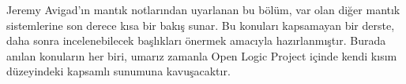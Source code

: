\documentclass[../../../include/open-logic-chapter]{subfiles}
\begin{document}

\begin{editorial}
  Jeremy Avigad'ın mantık notlarından uyarlanan bu bölüm, var olan diğer
  mantık sistemlerine son derece kısa bir bakış sunar. Bu konuları kapsamayan
  bir derste, daha sonra incelenebilecek başlıkları önermek amacıyla
  hazırlanmıştır. Burada anılan konuların her biri, umarız zamanla Open Logic
  Project içinde kendi kısım düzeyindeki kapsamlı sunumuna kavuşacaktır.
\end{editorial}








\OLEndChapterHook
\end{document}
